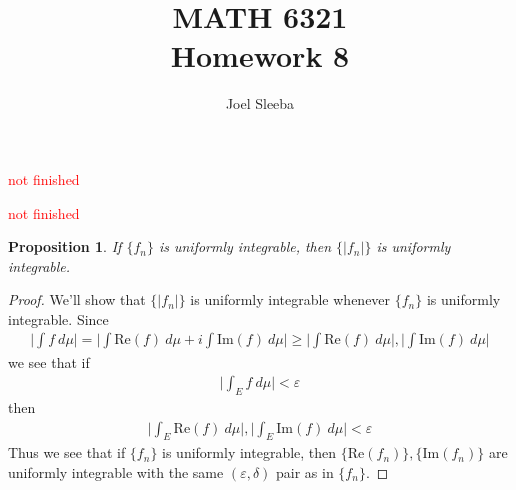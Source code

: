 \documentclass[12pt]{exam}
\theoremstyle{plain} %
\newtheorem{proposition}{Proposition}[section]
\theoremstyle{definition} %
\theoremstyle{remark} %
\begin{document}
\title{MATH 6321 \\ Homework 8}

\author{
  Joel Sleeba \\
}

\maketitle
\printanswers
\unframedsolutions

\begin{questions}

  \question
  \textcolor{red}{not finished}

  \begin{solution}

  \end{solution}

  \question
  \textcolor{red}{not finished}
  \begin{solution}
    \begin{proposition}
      If $\{ f_n \}$ is uniformly integrable, then $ \{ |f_n| \}$ is
      uniformly integrable.
    \end{proposition}
    \begin{proof}

      We'll show that $\{|f_n|\}$ is uniformly integrable whenever $\{
      f_n \}$ is uniformly integrable. Since
      \begin{align*}
        \Bigg| \int f \ d \mu \Bigg| = \Bigg| \int \textrm{Re}(f) \ d
        \mu + i \int
        \textrm{Im}(f) \ d \mu \Bigg| \ge \Bigg| \int \textrm{Re}(f)
        \ d \mu \Bigg| , \Bigg| \int  \textrm{Im}(f) \ d \mu \Bigg|
      \end{align*}
      we see that if
      \begin{align*}
        \Bigg| \int_E f \ d \mu \Bigg| < \varepsilon
      \end{align*}
      then
      \begin{align*}
        \Bigg| \int_E \textrm{Re}(f) \ d \mu \Bigg|, \Bigg| \int_E
        \textrm{Im}(f) \ d \mu  \Bigg| < \varepsilon
      \end{align*}
      Thus we see that if $\{f_n\}$ is uniformly integrable, then $\{
      \textrm{Re}(f_n) \}, \{  \textrm{Im}(f_n) \}$ are uniformly
      integrable with the same $(\varepsilon,\delta)$ pair as in $\{ f_n \}$.


\end{proof}
\end{solution}
\end{questions}
\end{document}
